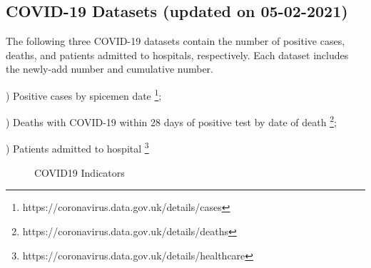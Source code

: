\documentclass[12pt, a4paper]{report}
\begin{document}
\subsection{COVID-19 Datasets (updated on 05-02-2021)}
The following three COVID-19 datasets contain the number of positive cases, deaths, and patients admitted to hospitals, 
respectively. Each dataset includes the newly-add number and cumulative number.\par
{}) Positive cases by spicemen date
\footnote[1]{https://coronavirus.data.gov.uk/details/cases};\par
{}) Deaths with COVID-19 within 28 days of positive test by date of death
\footnote[2]{https://coronavirus.data.gov.uk/details/deaths};\par
{}) Patients admitted to hospital
\footnote[3]{https://coronavirus.data.gov.uk/details/healthcare}\par
\begin{figure}[H]
\centering
    \caption{COVID19 Indicators}
    \label{Fig.main}
\end{figure}
\end{document}
